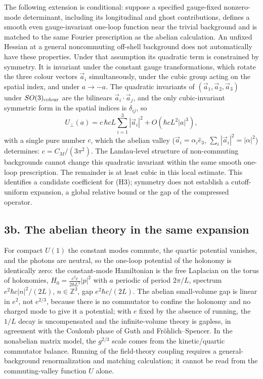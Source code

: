 \documentclass[11pt,a4paper]{article}
\begin{document}
The following extension is conditional: suppose a specified gauge-fixed
nonzero-mode determinant, including its longitudinal and ghost
contributions, defines a smooth even gauge-invariant one-loop function
near the trivial background and is matched to the same Fourier
prescription as the abelian calculation. An unfixed Hessian at a general
noncommuting off-shell background does not automatically have these
properties. Under that assumption its quadratic term is constrained by
symmetry. It is invariant under the constant gauge transformations,
which rotate the three colour vectors \(\vec a_i\) simultaneously, under
the cubic group acting on the spatial index, and under \(a\to-a\). The
quadratic invariants of \((\vec a_1,\vec a_2,\vec a_3)\) under
\(SO(3)_{\rm colour}\) are the bilinears \(\vec a_i\cdot\vec a_j\), and
the only cubic-invariant symmetric form in the spatial indices is
\(\delta_{ij}\), so
\[U_\perp(a)=c\,\hbar cL\sum_{i=1}^3|\vec a_i|^2+O(\hbar cL^2|a|^3),\]
with a single pure number \(c\), which the abelian valley
(\(\vec a_i=\alpha_i\hat e_3\), \(\sum_i|\vec a_i|^2=|\alpha|^2\))
determines: \(c=C_M/(3\pi^2)\). The Landau-level structure of
non-commuting backgrounds cannot change this quadratic invariant within
the same smooth one-loop prescription. The remainder is at least cubic
in this local estimate. This identifies a candidate coefficient for
(H3); symmetry does not establish a cutoff-uniform expansion, a global
relative bound or the gap of the compressed operator.

\hypertarget{b.-the-abelian-theory-in-the-same-expansion}{%
\subsection{3b. The abelian theory in the same
expansion}\label{b.-the-abelian-theory-in-the-same-expansion}}

For compact \(U(1)\) the constant modes commute, the quartic potential
vanishes, and the photons are neutral, so the one-loop potential of the
holonomy is identically zero: the constant-mode Hamiltonian is the free
Laplacian on the torus of holonomies,
\(H_0=\frac{e^2c}{2\hbar L^3}|p|^2\) with \(a\) periodic of period
\(2\pi/L\), spectrum \(e^2\hbar c|n|^2/(2L)\), \(n\in\mathbb Z^3\), gap
\(e^2\hbar c/(2L)\). The abelian small-volume gap is linear in \(e^2\),
not \(e^{2/3}\), because there is no commutator to confine the holonomy
and no charged mode to give it a potential; with \(e\) fixed by the
absence of running, the \(1/L\) decay is uncompensated and the
infinite-volume theory is gapless, in agreement with the Coulomb phase
of Guth and Fröhlich--Spencer. In the nonabelian matrix model, the
\(g^{2/3}\) scale comes from the kinetic/quartic commutator balance.
Running of the field-theory coupling requires a general-background
renormalization and matching calculation; it cannot be read from the
commuting-valley function \(U\) alone.
\end{document}
